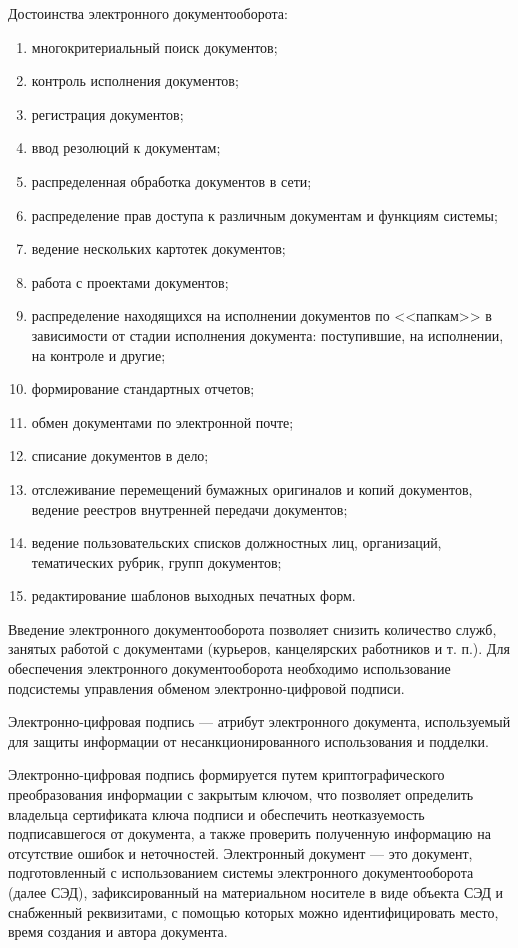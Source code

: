 Достоинства электронного документооборота:
\begin{enumerate}
  \item многокритериальный поиск документов;
  \item контроль исполнения документов;
  \item регистрация документов;
  \item ввод резолюций к документам;
  \item распределенная
обработка документов в сети;
  \item  распределение прав доступа к различным
документам и функциям системы;
  \item ведение нескольких картотек документов;
  \item работа с проектами документов;
  \item распределение находящихся на исполнении
документов по <<папкам>> в зависимости от стадии исполнения документа:
поступившие, на исполнении, на контроле и другие;
  \item формирование стандартных
отчетов;
  \item обмен документами по электронной почте;
  \item списание документов в дело;
  \item отслеживание перемещений бумажных оригиналов и копий документов,
ведение реестров внутренней передачи документов;
  \item ведение пользовательских
списков должностных лиц, организаций, тематических рубрик, групп документов;
  \item редактирование шаблонов выходных печатных форм.~\cite{kuznecov}
\end{enumerate}

Введение электронного документооборота позволяет снизить количество служб,
занятых работой с документами (курьеров, канцелярских работников и т. п.).
Для обеспечения электронного документооборота необходимо использование
подсистемы управления обменом электронно-цифровой подписи.

Электронно-цифровая подпись --- атрибут электронного документа, используемый для
защиты информации от несанкционированного использования и подделки.

Электронно-цифровая подпись формируется путем криптографического преобразования
информации с закрытым ключом, что позволяет определить владельца сертификата
ключа подписи и обеспечить неотказуемость подписавшегося от документа, а также
проверить полученную информацию на отсутствие ошибок и неточностей. Электронный
документ --- это документ, подготовленный с использованием системы электронного
документооборота (далее СЭД), зафиксированный на материальном носителе в виде
объекта СЭД и снабженный реквизитами, с помощью которых можно идентифицировать место, время
создания и автора документа.

